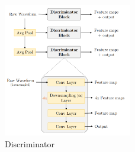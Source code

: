 \documentclass[12pt]{report}
\begin{document}
\begin{figure}[H]
\centering
\includegraphics[width=0.5\textwidth]{Images/discriminator.png}
\caption{Discriminator}
\end{figure}
\end{document}
